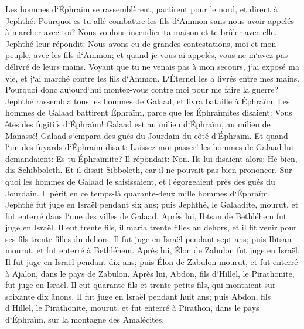\verse Les hommes d`Éphraïm se rassemblèrent, partirent pour le nord, et dirent à Jephthé: Pourquoi es-tu allé combattre les fils d`Ammon sans nous avoir appelés à marcher avec toi? Nous voulons incendier ta maison et te brûler avec elle. 
\verse Jephthé leur répondit: Nous avons eu de grandes contestations, moi et mon peuple, avec les fils d`Ammon; et quand je vous ai appelés, vous ne m`avez pas délivré de leurs mains. 
\verse Voyant que tu ne venais pas à mon secours, j`ai exposé ma vie, et j`ai marché contre les fils d`Ammon. L`Éternel les a livrés entre mes mains. Pourquoi donc aujourd`hui montez-vous contre moi pour me faire la guerre? 
\verse Jephthé rassembla tous les hommes de Galaad, et livra bataille à Éphraïm. Les hommes de Galaad battirent Éphraïm, parce que les Éphraïmites disaient: Vous êtes des fugitifs d`Éphraïm! Galaad est au milieu d`Éphraïm, au milieu de Manassé! 
\verse Galaad s`empara des gués du Jourdain du côté d`Éphraïm. Et quand l`un des fuyards d`Éphraïm disait: Laissez-moi passer! les hommes de Galaad lui demandaient: Es-tu Éphraïmite? Il répondait: Non. 
\verse Ils lui disaient alors: Hé bien, dis Schibboleth. Et il disait Sibboleth, car il ne pouvait pas bien prononcer. Sur quoi les hommes de Galaad le saisissaient, et l`égorgeaient près des gués du Jourdain. Il périt en ce temps-là quarante-deux mille hommes d`Éphraïm. 
\verse Jephthé fut juge en Israël pendant six ans; puis Jephthé, le Galaadite, mourut, et fut enterré dans l`une des villes de Galaad. 
\verse Après lui, Ibtsan de Bethléhem fut juge en Israël. 
\verse Il eut trente fils, il maria trente filles au dehors, et il fit venir pour ses fils trente filles du dehors. Il fut juge en Israël pendant sept ans; 
\verse puis Ibtsan mourut, et fut enterré à Bethléhem. 
\verse Après lui, Élon de Zabulon fut juge en Israël. Il fut juge en Israël pendant dix ans; 
\verse puis Élon de Zabulon mourut, et fut enterré à Ajalon, dans le pays de Zabulon. 
\verse Après lui, Abdon, fils d`Hillel, le Pirathonite, fut juge en Israël. 
\verse Il eut quarante fils et trente petits-fils, qui montaient sur soixante dix ânons. Il fut juge en Israël pendant huit ans; 
\verse puis Abdon, fils d`Hillel, le Pirathonite, mourut, et fut enterré à Pirathon, dans le pays d`Éphraïm, sur la montagne des Amalécites. 

\chapter{}

